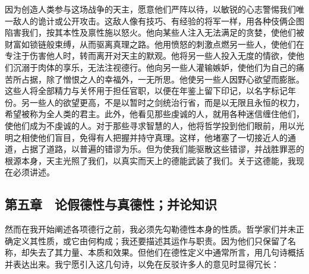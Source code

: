 因为创造人类参与这场战争的天主，愿意他们严阵以待，以敏锐的心志警惕我们唯一敌人的诡计或公开攻击。这敌人像有技巧、有经验的将军一样，用各种伎俩企图陷害我们，按其本性及禀性施以怒火。他向某些人注入无法满足的贪婪，使他们被财富如锁链般束缚，从而驱离真理之路。他用愤怒的刺激点燃另一些人，使他们在专注于伤害他人时，转而离开对天主的默观。他将另一些人投入无度的情欲，使他们沉溺于肉体的享乐，无法注视德行。他向另一些人灌输嫉妒，使他们为自己的痛苦所占据，除了憎恨之人的幸福外，一无所思。他使另一些人因野心欲望而膨胀。这些人将全部精力与关怀用于担任官职，以便在年鉴上留下印记，以名字标记年份。另一些人的欲望更高，不是以暂时之剑统治行省，而是以无限且永恒的权力，希望被称为全人类的君主。此外，他看见那些虔诚的人，就用各种迷信缠住他们，使他们成为不虔诚的人。对于那些寻求智慧的人，他将哲学投到他们眼前，用以光明之相使他们盲目，免得有人把握并持守真理。这样，他堵塞了一切接近人的通道，占据了道路，以普遍的错谬为乐。但为使我们能驱散这些错谬，并战胜罪恶的根源本身，天主光照了我们，以真实而天上的德能武装了我们。关于这德能，我现在必须讲述。\par


\subsection{第五章　论假德性与真德性；并论知识}

然而在我开始阐述各项德行之前，我必须先勾勒德性本身的性质。哲学家们并未正确定义其性质，或它由何构成；我还要描述其运作与职责。因为他们只保留了名称，却失去了其力量、本质和效果。但他们在德性定义中通常所言，用几句诗概括并表达出来。我宁愿引入这几句诗，以免在反驳许多人的意见时显得冗长：\par

\par

